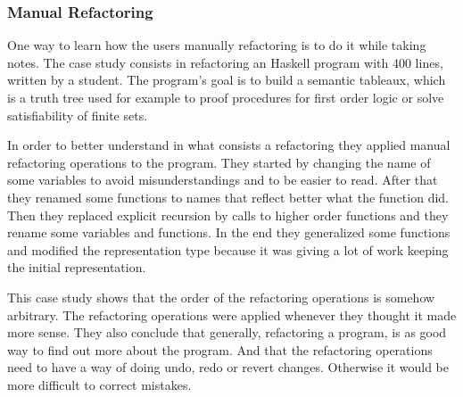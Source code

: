 


\subsubsection{Manual Refactoring}
\label{ssub:Manual-Refactoring}
One way to learn how the users manually refactoring is to do it while taking notes.
The case study\cite{thompson2003case} consists in refactoring an Haskell program with 400 lines, written by a student.
The program's goal is to build a semantic tableaux, which is a truth tree used for example to proof procedures for first order logic or solve satisfiability of finite sets.

In order to better understand in what consists a refactoring they applied manual refactoring operations to the program.
They started by changing the name of some variables to avoid misunderstandings and to be easier to read.
After that they renamed some functions to names that reflect better what the function did. 
Then they replaced explicit recursion by calls to higher order functions and they rename some variables and functions.
In the end they generalized some functions and modified the representation type because it was giving a lot of work keeping the initial representation.

This case study shows that the order of the refactoring operations is somehow arbitrary.
The refactoring operations were applied whenever they thought it made more sense.
They also conclude that generally, refactoring a program, is as good way to find out more about the program. 
And that the refactoring operations need to have a way of doing undo, redo or revert changes. 
Otherwise it would be more difficult to correct mistakes.

